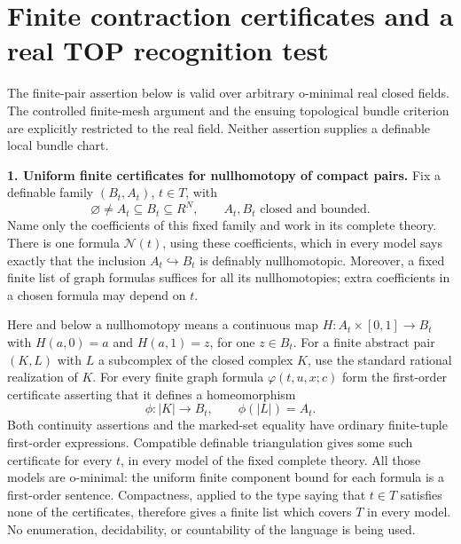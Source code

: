 \section*{Finite contraction certificates and a real TOP recognition test}

The finite-pair assertion below is valid over arbitrary o-minimal real
closed fields. The controlled finite-mesh argument and the ensuing
topological bundle criterion are explicitly restricted to the real
field. Neither assertion supplies a definable local bundle chart.

\textbf{1. Uniform finite certificates for nullhomotopy of compact pairs.}
Fix a definable family $(B_t,A_t)$, $t\in T$, with
\[
 \varnothing\ne A_t\subseteq B_t\subseteq R^N,
 \qquad A_t,B_t\text{ closed and bounded}.
 \tag{LC.1}
\]
Name only the coefficients of this fixed family and work in its complete
theory. There is one formula $\mathcal N(t)$, using these coefficients,
which in every model says exactly that the inclusion $A_t\hookrightarrow
B_t$ is definably nullhomotopic. Moreover, a fixed finite list of graph
formulas suffices for all its nullhomotopies; extra coefficients in a
chosen formula may depend on $t$.

Here and below a nullhomotopy means a continuous map
$H:A_t\times[0,1]\to B_t$ with $H(a,0)=a$ and $H(a,1)=z$, for one
$z\in B_t$. For a finite abstract pair $(K,L)$ with $L$ a subcomplex of
the closed complex $K$, use the standard rational realization of $K$.
For every finite graph formula $\varphi(t,u,x;c)$ form the first-order
certificate asserting that it defines a homeomorphism
\[
 \phi:|K|\longrightarrow B_t,\qquad \phi(|L|)=A_t.
 \tag{LC.2}
\]
Both continuity assertions and the marked-set equality have ordinary
finite-tuple first-order expressions. Compatible definable triangulation
gives some such certificate for every $t$, in every model of the fixed
complete theory. All those models are o-minimal: the uniform finite
component bound for each formula is a first-order sentence. Compactness,
applied to the type saying that $t\in T$ satisfies none of the
certificates, therefore gives a finite list which covers $T$ in every
model. No enumeration, decidability, or countability of the language is
being used.

